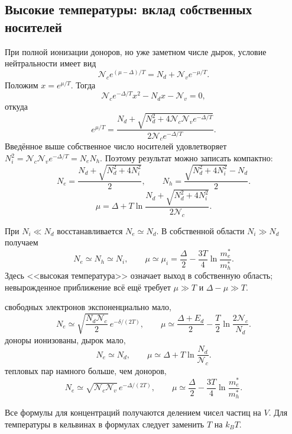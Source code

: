 \documentclass[../final.tex]{subfiles}
\begin{document}
\subsection*{Высокие температуры: вклад собственных носителей}

При полной ионизации доноров, но уже заметном числе дырок,
условие нейтральности имеет вид
\[
\mathcal N_c e^{(\mu-\Delta)/T}=N_d+\mathcal N_v e^{-\mu/T}.
\]
Положим $x=e^{\mu/T}$. Тогда
\[
\mathcal N_c e^{-\Delta/T}x^2-N_dx-\mathcal N_v=0,
\]
откуда
\[
e^{\mu/T}=\frac{N_d+
    \sqrt{N_d^2+4\mathcal N_c\mathcal N_v e^{-\Delta/T}}}
    {2\mathcal N_c e^{-\Delta/T}}.
\]
Введённое выше собственное число носителей удовлетворяет
$N_i^2=\mathcal N_c\mathcal N_v e^{-\Delta/T}=N_eN_h$.
Поэтому результат можно записать компактно:
\[
N_e=\frac{N_d+\sqrt{N_d^2+4N_i^2}}{2},\qquad
    N_h=\frac{\sqrt{N_d^2+4N_i^2}-N_d}{2}.
\]
\[
\mu=\Delta+T\ln\frac{N_d+\sqrt{N_d^2+4N_i^2}}
    {2\mathcal N_c}.
\]

При $N_i\ll N_d$ восстанавливается $N_e\simeq N_d$.
В собственной области $N_i\gg N_d$ получаем
\[
N_e\simeq N_h\simeq N_i,\qquad
    \mu\simeq\mu_i=\frac\Delta2-\frac{3T}{4}\ln\frac{m_e^*}{m_h^*}.
\]
Здесь <<высокая температура>> означает выход в собственную область;
невырожденное приближение всё ещё требует $\mu\gg T$ и $\Delta-\mu\gg T$.

\clearpage
\answer
{} свободных электронов экспоненциально мало,
\[
N_e\simeq\sqrt{\frac{N_d\mathcal N_c}{2}}\,e^{-\delta/(2T)},\qquad
    \mu\simeq\frac{\Delta+E_d}{2}-\frac T2\ln\frac{2\mathcal N_c}{N_d}.
\]
 доноры ионизованы, дырок мало,
\[
N_e\simeq N_d,\qquad \mu\simeq\Delta+T\ln\frac{N_d}{\mathcal N_c}.
\]
 тепловых пар намного больше, чем доноров,
\[
N_e\simeq\sqrt{\mathcal N_c\mathcal N_v}\,e^{-\Delta/(2T)},\qquad
    \mu\simeq\frac\Delta2-\frac{3T}{4}\ln\frac{m_e^*}{m_h^*}.
\]

Все формулы для концентраций получаются делением чисел частиц на
$V$. Для температуры в кельвинах в формулах следует заменить $T$ на $k_BT$.
\end{document}
